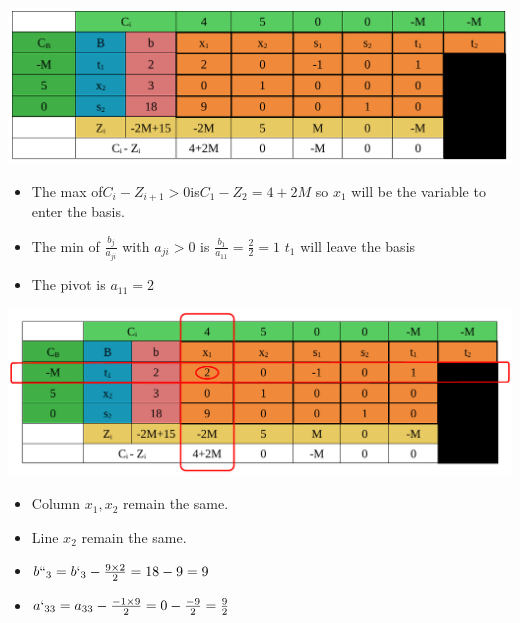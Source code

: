 \vspace{0.25cm}

\begin{center}
    \includegraphics{Chapters/Simplexe/EX/EX2/ex2.3.pdf}
\end{center}

\vspace{0.25cm}
\begin{itemize}   
    \item The max of\hspace{0.2cm}\(C_i - Z_{i+1} > 0\)\hspace{0.2cm}is\hspace{0.2cm}\(C_1 - Z_2 = 4+2M\)\hspace{0.1cm} so \(x_1\) 
will be the variable to enter the basis.
\item The min of \hspace{0.1cm}\(\frac{b_j}{a_{ji}}\)\hspace{0.1cm} with \(a_{ji} > 0\)\hspace{0.1cm} is \hspace{0.1cm} \(\frac{b_1}{a_{11}} = \frac{2}{2} = 1\)\hspace{0.35cm} \(t_1\)
will leave the basis
\item The pivot is \(a_{11} = 2\)
 
\end{itemize}


\begin{center}
    \includegraphics{Chapters/Simplexe/EX/EX2/ex2.4.pdf}
\end{center}

\vspace{0.25cm}
\begin{itemize}
 \item Column \(x_1 , x_2\) remain the same.
 \item Line \(x_2\) remain the same.
 \item \(b``_3 = b`_3 - \frac{9\times2}{2} = 18 - 9 = 9\)
 \item \(a`_{33} = a_{33} - \frac{-1\times9}{2} = 0 - \frac{-9}{2} = \frac{9}{2}\)
\end{itemize}


